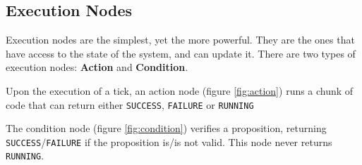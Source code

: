 \documentclass[a4paper,UKenglish,cleveref, autoref, thm-restate]{oasics-v2019}
\begin{document}
\subsection{Execution Nodes}
Execution nodes are the simplest, yet the more powerful. They are the ones that have access to the state of the system, and can update it.
There are two types of execution nodes: \textbf{Action} and \textbf{Condition}.


Upon the execution of a tick, an action node (figure \ref{fig:action}) runs a chunk of code that can return either \texttt{SUCCESS}, \texttt{FAILURE} or \texttt{RUNNING}


The condition node (figure \ref{fig:condition}) verifies a proposition, returning \texttt{SUCCESS}/\texttt{FAILURE} if the proposition is/is not valid.
This node never returns \texttt{RUNNING}.
\end{document}
